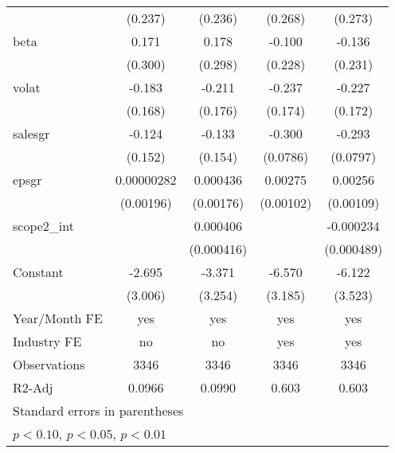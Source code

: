 \begin{table}[htbp]
\begin{tabular}{l*{4}{c}}
                    &     (0.237)         &     (0.236)         &     (0.268)         &     (0.273)         \\
[1em]
beta                &       0.171         &       0.178         &      -0.100         &      -0.136         \\
                    &     (0.300)         &     (0.298)         &     (0.228)         &     (0.231)         \\
[1em]
volat               &      -0.183         &      -0.211         &      -0.237         &      -0.227         \\
                    &     (0.168)         &     (0.176)         &     (0.174)         &     (0.172)         \\
[1em]
salesgr             &      -0.124         &      -0.133         &      -0.300\sym{***}&      -0.293\sym{***}\\
                    &     (0.152)         &     (0.154)         &    (0.0786)         &    (0.0797)         \\
[1em]
epsgr               &  0.00000282         &    0.000436         &     0.00275\sym{***}&     0.00256\sym{**} \\
                    &   (0.00196)         &   (0.00176)         &   (0.00102)         &   (0.00109)         \\
[1em]
scope2\_int          &                     &    0.000406         &                     &   -0.000234         \\
                    &                     &  (0.000416)         &                     &  (0.000489)         \\
[1em]
Constant            &      -2.695         &      -3.371         &      -6.570\sym{**} &      -6.122\sym{*}  \\
                    &     (3.006)         &     (3.254)         &     (3.185)         &     (3.523)         \\
\hline
Year/Month FE       &         yes         &         yes         &         yes         &         yes         \\
Industry FE         &          no         &          no         &         yes         &         yes         \\
Observations        &        3346         &        3346         &        3346         &        3346         \\
R2-Adj              &      0.0966         &      0.0990         &       0.603         &       0.603         \\
\hline\hline
\multicolumn{5}{l}{\footnotesize Standard errors in parentheses}\\
\multicolumn{5}{l}{\footnotesize \sym{*} \(p<0.10\), \sym{**} \(p<0.05\), \sym{***} \(p<0.01\)}\\
\end{tabular}
\end{table}
